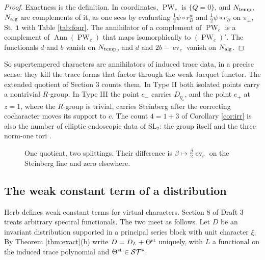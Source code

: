\documentclass[12pt,letterpaper]{amsart}
\numberwithin{equation}{section}
\theoremstyle{definition}
\theoremstyle{remark}
\newcommand{\St}{\mathrm{St}}
\newcommand{\triv}{\mathbf 1}
\newcommand{\PW}{\operatorname{PW}}
\newcommand{\ST}{\mathcal{ST}}
\newcommand{\Ann}{\operatorname{Ann}}
\newcommand{\ev}{\operatorname{ev}}
\begin{document}
\begin{proof}
Exactness is the definition. In coordinates, $\PW_c$ is $\{Q=0\}$, and $N_{\rm temp}$, $N_{\rm alg}$ are complements of it, as one sees by evaluating $\tfrac12\psi\circ r_B^w$ and $\tfrac12\psi\circ r_B$ on $\pi_\pm$, $\St$, $\triv$ with Table \ref{tab:four}. The annihilator of a complement of $\PW_c$ is a complement of $\Ann(\PW_c)$ that maps isomorphically to $(\PW_c)'$. The functionals $d$ and $b$ vanish on $N_{\rm temp}$, and $d$ and $2b-\ev_c$ vanish on $N_{\rm alg}$.
\end{proof}
So supertempered characters are annihilators of induced trace data, in a precise sense: they kill the trace forms that factor through the weak Jacquet functor. The extended quotient of Section 3 counts them. In Type II both isolated points carry a nontrivial $R$-group. In Type III the point $e_-$ carries $D_{\eta_\varepsilon}$, and the point $e_+$ at $z=1$, where the $R$-group is trivial, carries Steinberg after the correcting cocharacter moves its support to $c$. The count $4=1+3$ of Corollary \ref{cor:irr} is also the number of elliptic endoscopic data of $\mathrm{SL}_2$: the group itself and the three norm-one tori \cite{LL79}.

\begin{figure}[htbp]\centering
{}
\caption{One quotient, two splittings. Their difference is $\beta\mapsto\frac\beta2\ev_c$ on the Steinberg line and zero elsewhere.}\label{fig:splittings}
\end{figure}

\subsection{The weak constant term of a distribution}\label{sub:wct}
Herb defines weak constant terms for virtual characters. Section 8 of Draft 3 treats arbitrary spectral functionals. The two meet as follows. Let $D$ be an invariant distribution supported in a principal series block with unit character $\xi$. By Theorem \ref{thm:exact}(b) write $D=D_L+\Theta^{\rm st}$ uniquely, with $L$ a functional on the induced trace polynomial and $\Theta^{\rm st}\in\ST^{\mathfrak s}$.
\end{document}
